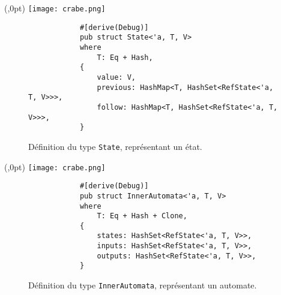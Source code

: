\documentclass[aspectratio=169,xcolor=dvipsnames]{beamer}
\begin{document}

\begin{frame}[fragile]
    \begin{textblock*}{20pt}(\textwidth-70pt,0pt)
        \texttt{[image: crabe.png]}
    \end{textblock*}
    \begin{figure}  
        \begin{verbatim}
            #[derive(Debug)]
            pub struct State<'a, T, V>
            where
                T: Eq + Hash,
            {
                value: V,
                previous: HashMap<T, HashSet<RefState<'a, T, V>>>,
                follow: HashMap<T, HashSet<RefState<'a, T, V>>>,
            }
        \end{verbatim}
        \caption{
            Définition du type \texttt{State}, représentant un 
            état.
        }
    \end{figure}  
\end{frame}




\begin{frame}[fragile]
    \begin{textblock*}{20pt}(\textwidth-70pt,0pt)
        \texttt{[image: crabe.png]}
    \end{textblock*}
    \begin{figure}  
        \begin{verbatim}
            #[derive(Debug)]
            pub struct InnerAutomata<'a, T, V>
            where
                T: Eq + Hash + Clone,
            {
                states: HashSet<RefState<'a, T, V>>,
                inputs: HashSet<RefState<'a, T, V>>,
                outputs: HashSet<RefState<'a, T, V>>,
            }
        \end{verbatim}
        \caption{
            Définition du type \texttt{InnerAutomata}, représentant
            un automate.
        }
    \end{figure}  
\end{frame}


\end{document}
